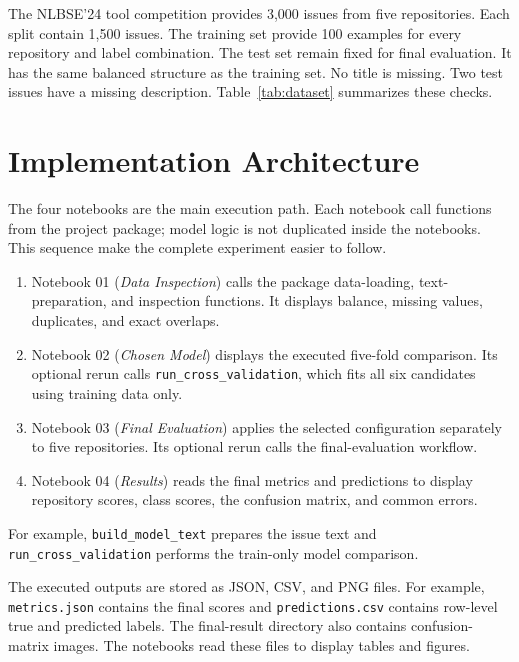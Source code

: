 \documentclass[11pt,a4paper]{article}
\begin{document}
The NLBSE'24 tool competition provides 3,000 issues from five repositories. Each split contain %
1,500 issues. The training set provide 100 examples for every repository and %
label combination. The test set remain fixed for final evaluation. %
It has the same balanced structure as the training set. No title is missing.
Two test issues have a missing description. Table~\ref{tab:dataset} summarizes
these checks.

\begin{table}[H]
\centering\small
\caption{Size and quality checks for the official dataset split.}
\label{tab:dataset}

\end{table}

\section{Implementation Architecture}

The four notebooks are the main execution path. Each notebook call functions %
from the project package; model logic is not duplicated inside the notebooks.
This sequence make the complete experiment easier to follow. %

\begin{enumerate}
  \item Notebook 01 (\emph{Data Inspection}) calls the package data-loading,
  text-preparation, and inspection functions. It displays balance, missing
  values, duplicates, and exact overlaps.
  \item Notebook 02 (\emph{Chosen Model}) displays the executed five-fold
  comparison. Its optional rerun calls \texttt{run\_cross\_validation}, which
  fits all six candidates using training data only.
  \item Notebook 03 (\emph{Final Evaluation}) applies the selected
  configuration separately to five repositories. Its optional rerun calls the
  final-evaluation workflow.
  \item Notebook 04 (\emph{Results}) reads the final metrics and predictions to
  display repository scores, class scores, the confusion matrix, and common
  errors.
\end{enumerate}

For example, \texttt{build\_model\_text} prepares the issue text and
\texttt{run\_cross\_validation} performs the train-only model comparison.

The executed outputs are stored as JSON, CSV, and PNG files. For example,
\texttt{metrics.json} contains the final scores and \texttt{predictions.csv}
contains row-level true and predicted labels. The final-result directory also
contains confusion-matrix images. The notebooks read these files to display
tables and figures.
\end{document}
